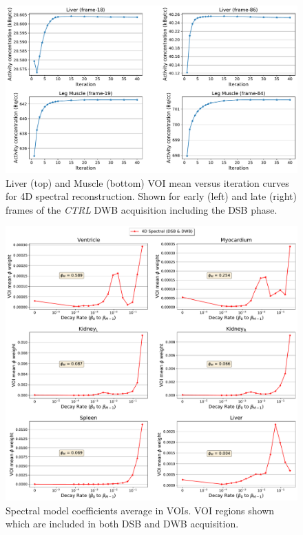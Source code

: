 \begin{figure} [h!]
\centering
\includegraphics[scale=0.5,angle=0]{3_Results/3_3_DWB_Reconstruction/figures/3_3_IsotoPK_CTRL_DWB_4D_Convergence.pdf}
\caption{Liver (top) and Muscle (bottom) VOI mean versus iteration curves for 4D spectral reconstruction. Shown for early (left) and late (right) frames of the \textit{CTRL} DWB acquisition including the DSB phase.}
\label{fig_3_3:IsotoPK_CTRL_DSB_3D_Convergence}
\end{figure} 


\begin{figure} [h!]
\centering
\includegraphics[scale=0.48,angle=0]{3_Results/3_3_DWB_Reconstruction/figures/3_3_IsotoPK_CTRL_DWB_SpectralParams_central_.pdf}
\caption{Spectral model coefficients average in VOIs. VOI regions shown which are included in both DSB and DWB acquisition.}
\label{fig_3_3:IsotoPK_CTRL_DWB_Spectrals}
\end{figure} 

